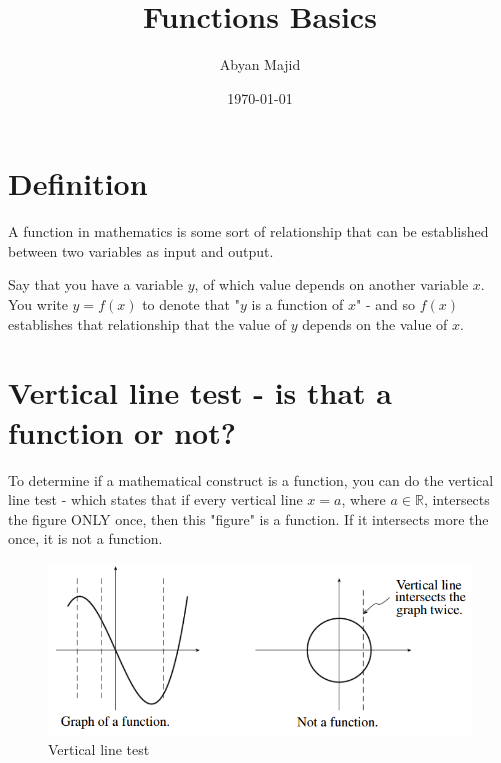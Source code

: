 \documentclass{article}
\begin{document}
\title{Functions Basics}
\author{Abyan Majid}
\date{\today}
\maketitle

\section{Definition}

\noindent A function in mathematics is some sort of relationship that can be established between two variables as input and output.

\vspace{\baselineskip}

\noindent Say that you have a variable $y$, of which value depends on another variable $x$. You write $y=f(x)$ to denote that "$y$ is a function of $x$" - and so $f(x)$ establishes that relationship that the value of $y$ depends on the value of $x$.

\section{Vertical line test - is that a function or not?}

To determine if a mathematical construct is a function, you can do the vertical line test - which states that if every vertical line $x=a$, where $a\in\mathbb{R}$, intersects the figure ONLY once, then this "figure" is a function. If it intersects more the once, it is not a function.

\begin{figure}[H]
    \centering
    \includegraphics{../../../!assets/MATH1021-006-fig1.png}
    \caption{Vertical line test}
\end{figure}
\end{document}
